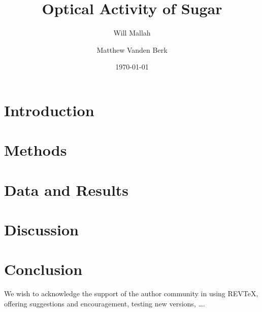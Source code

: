 \documentclass[%
 reprint,
 amsmath,amssymb,
 aps,
]{revtex4-2}
\begin{document}

\title{Optical Activity of Sugar}

\author{Will Mallah}

\author{Matthew Vanden Berk}


\date{\today}

\begin{abstract}
    
\end{abstract}

\maketitle

\section{Introduction}


\newpage
\section{Methods}


\newpage
\section{Data and Results}


\newpage
\section{Discussion}


\newpage
\section{Conclusion}


\newpage
\begin{acknowledgments}
    We wish to acknowledge the support of the author community in using
    REV\TeX{}, offering suggestions and encouragement, testing new versions,
    \dots.
    \end{acknowledgments}
    
    \appendix
    
\end{document}
